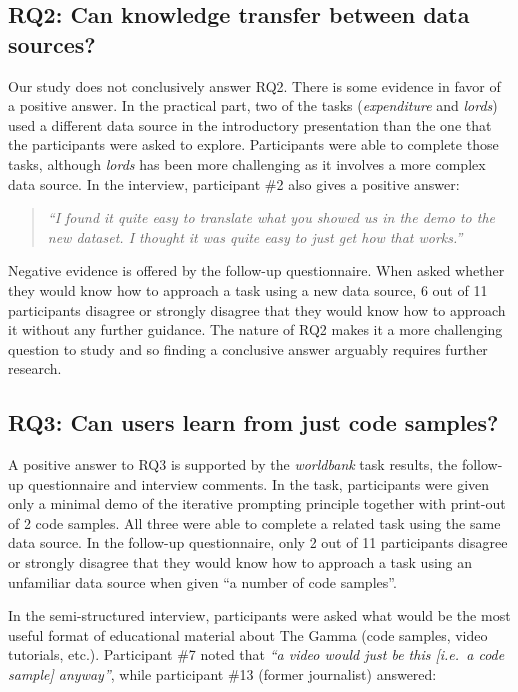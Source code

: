 \documentclass[manuscript,review,anonymous]{acmart}
\begin{document}
\subsection*{RQ2: Can knowledge transfer between data sources?}
Our study does not conclusively answer RQ2. There is some evidence in favor of a positive answer.
In the practical part, two of the tasks (\emph{expenditure} and \emph{lords}) used a different data
source in the introductory presentation than the one that the participants were asked to explore.
Participants were able to complete those tasks, although \emph{lords} has been more challenging
as it involves a more complex data source. In the interview, participant \#2 also gives a positive
answer:

\begin{quote}
\emph{``I found it quite easy to translate what you showed us in the demo to the new dataset.
   I thought it was quite easy to just get how that works.''}
\end{quote}

\noindent
Negative evidence is offered by the follow-up questionnaire. When asked
whether they would know how to approach a task using a new data source, 6 out of 11 participants
disagree or strongly disagree that they would know how to approach it without any further guidance.
The nature of RQ2 makes it a more challenging question to study and so finding a conclusive answer
arguably requires further research.

\subsection*{RQ3: Can users learn from just code samples?}
A positive answer to RQ3 is supported by the \emph{worldbank} task results, the follow-up questionnaire
and interview comments. In the task, participants were given only a
minimal demo of the iterative prompting principle together with print-out of 2 code samples.
All three were able to complete a related task using the same data source. In the follow-up
questionnaire, only 2 out of 11 participants disagree or strongly disagree that
they would know how to approach a task using an unfamiliar data source when given ``a number
of code samples''.

In the semi-structured interview, participants were asked what would be the most useful format
of educational material about The Gamma (code samples, video tutorials, etc.).
Participant \#7 noted that \emph{``a video would just be this [i.e.~a code sample] anyway''}, while
participant \#13 (former journalist) answered:
\end{document}

